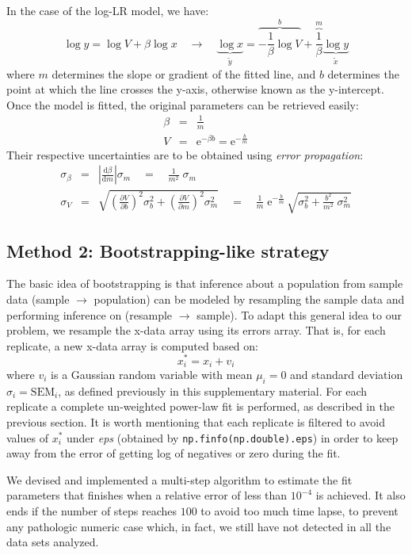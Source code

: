 \documentclass[12pt,oneside,letterpaper]{article}
\begin{document}
In the case of the log-LR model, we have:
$$\log y = \log V + \beta\log x \quad\rightarrow\quad \underbrace{\log x}_{\tilde y} = \overbrace{-\frac{1}{\beta}\log V}^{b} + \overbrace{\frac{1}{\beta}}^{m}\underbrace{\log y}_{\tilde x}$$ 
where $m$ determines the slope or gradient of the fitted line, and $b$ determines the point at which the line crosses the y-axis, otherwise known as the y-intercept. Once the model is fitted, the original parameters can be retrieved easily:
\begin{eqnarray*}
\beta &=& \frac{1}{m} \\
V &=& \mathrm{e}^{-\beta b} = \mathrm{e}^{-\frac{b}{m}}
\end{eqnarray*}
Their respective uncertainties are to be obtained using \emph{error propagation}:
\begin{eqnarray*}
    \sigma_\beta &=& \left|\frac{\mathrm{d}\beta}{\mathrm{d}m}\right|\sigma_m \quad=\quad \frac{1}{m^2}\;\sigma_m \\
    \sigma_V &=& \sqrt{\left(\frac{\partial V}{\partial b}\right)^{\!\!2}\sigma_b^2 +
      \left(\frac{\partial V}{\partial m}\right)^{\!\!2}\sigma_m^2} \quad=\quad
      \frac{1}{m}\;\mathrm{e}^{-\frac{b}{m}}\,\sqrt{\sigma_b^2 + \frac{b^2}{m^2}\;\sigma_m^2} 
\end{eqnarray*}

\subsection{Method 2: Bootstrapping-like strategy}

The basic idea of bootstrapping is that inference about a population from sample data (sample $\rightarrow$ population) can be modeled by resampling the sample data and performing inference on (resample $\rightarrow$ sample). To adapt this general idea to our problem, we resample the x-data array using its errors array. That is, for each replicate, a new x-data array is computed based on:
$$x^*_i = x_i + v_i$$
where $v_i$ is a Gaussian random variable with mean $\mu_i=0$ and standard deviation $\sigma_i=\mathrm{SEM}_i$, as defined previously in this supplementary material. For each replicate a complete un-weighted power-law fit is performed, as described in the previous section. It is worth mentioning that each replicate is filtered to avoid values of $x^*_i$ under \emph{eps} (obtained by \texttt{np.finfo(np.double).eps}) in order to keep away from the error of getting log of negatives or zero during the fit.

We devised and implemented a multi-step algorithm to estimate the fit parameters that finishes when a relative error of less than $10^{-4}$ is achieved. It also ends if the number of steps reaches $100$ to avoid too much time lapse, to prevent any pathologic numeric case which, in fact, we still have not detected in all the data sets analyzed.
\end{document}
